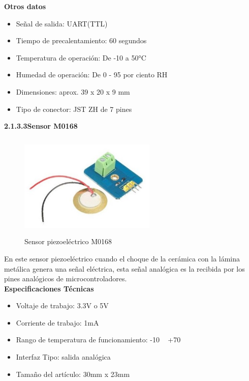 \textbf{Otros datos}
\begin{itemize}
    \item Señal de salida: UART(TTL)
    \item Tiempo de precalentamiento: 60 segundos
    \item Temperatura de operación: De -10 a 50°C
    \item Humedad de operación: De 0 - 95 por ciento RH
    \item Dimensiones: aprox. 39 x 20 x 9 mm
    \item Tipo de conector: JST ZH de 7 pines
\end{itemize}

\vspace{0.5cm}

        \textbf{2.1.3.3\hspace{5mm}Sensor M0168}

\begin{figure}[H]
      \centering
      \includegraphics[width=6.5cm, height=5cm]{imagenes/sensor-piezoelectrico.jpg}
      \caption{Sensor piezoeléctrico M0168}
      \label{imag:M0168}
   \end{figure}

En este sensor piezoeléctrico cuando el choque de la cerámica con la lámina metálica genera una señal eléctrica, esta señal analógica es la recibida por los pines analógicos de microcontroladores.\\

\textbf{Especificaciones Técnicas}

\begin{itemize}
    \item Voltaje de trabajo: 3.3V o 5V
    \item Corriente de trabajo: 1mA
    \item Rango de temperatura de funcionamiento: -10 ~ +70
    \item Interfaz Tipo: salida analógica
    \item Tamaño del artículo: 30mm x 23mm
\end{itemize}

